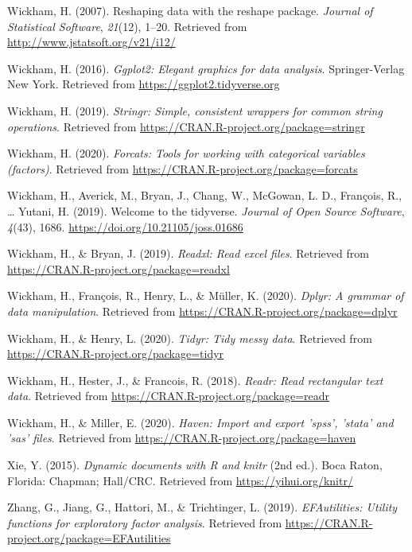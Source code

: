 \documentclass[
  english,
  man]{apa6}
\begin{document}
\leavevmode\hypertarget{ref-R-reshape2}{}%
Wickham, H. (2007). Reshaping data with the reshape package. \emph{Journal of Statistical Software}, \emph{21}(12), 1--20. Retrieved from \url{http://www.jstatsoft.org/v21/i12/}

\leavevmode\hypertarget{ref-R-ggplot2}{}%
Wickham, H. (2016). \emph{Ggplot2: Elegant graphics for data analysis}. Springer-Verlag New York. Retrieved from \url{https://ggplot2.tidyverse.org}

\leavevmode\hypertarget{ref-R-stringr}{}%
Wickham, H. (2019). \emph{Stringr: Simple, consistent wrappers for common string operations}. Retrieved from \url{https://CRAN.R-project.org/package=stringr}

\leavevmode\hypertarget{ref-R-forcats}{}%
Wickham, H. (2020). \emph{Forcats: Tools for working with categorical variables (factors)}. Retrieved from \url{https://CRAN.R-project.org/package=forcats}

\leavevmode\hypertarget{ref-R-tidyverse}{}%
Wickham, H., Averick, M., Bryan, J., Chang, W., McGowan, L. D., François, R., \ldots{} Yutani, H. (2019). Welcome to the tidyverse. \emph{Journal of Open Source Software}, \emph{4}(43), 1686. \url{https://doi.org/10.21105/joss.01686}

\leavevmode\hypertarget{ref-R-readxl}{}%
Wickham, H., \& Bryan, J. (2019). \emph{Readxl: Read excel files}. Retrieved from \url{https://CRAN.R-project.org/package=readxl}

\leavevmode\hypertarget{ref-R-dplyr}{}%
Wickham, H., François, R., Henry, L., \& Müller, K. (2020). \emph{Dplyr: A grammar of data manipulation}. Retrieved from \url{https://CRAN.R-project.org/package=dplyr}

\leavevmode\hypertarget{ref-R-tidyr}{}%
Wickham, H., \& Henry, L. (2020). \emph{Tidyr: Tidy messy data}. Retrieved from \url{https://CRAN.R-project.org/package=tidyr}

\leavevmode\hypertarget{ref-R-readr}{}%
Wickham, H., Hester, J., \& Francois, R. (2018). \emph{Readr: Read rectangular text data}. Retrieved from \url{https://CRAN.R-project.org/package=readr}

\leavevmode\hypertarget{ref-R-haven}{}%
Wickham, H., \& Miller, E. (2020). \emph{Haven: Import and export 'spss', 'stata' and 'sas' files}. Retrieved from \url{https://CRAN.R-project.org/package=haven}

\leavevmode\hypertarget{ref-R-knitr}{}%
Xie, Y. (2015). \emph{Dynamic documents with R and knitr} (2nd ed.). Boca Raton, Florida: Chapman; Hall/CRC. Retrieved from \url{https://yihui.org/knitr/}

\leavevmode\hypertarget{ref-R-EFAutilities}{}%
Zhang, G., Jiang, G., Hattori, M., \& Trichtinger, L. (2019). \emph{EFAutilities: Utility functions for exploratory factor analysis}. Retrieved from \url{https://CRAN.R-project.org/package=EFAutilities}

\endgroup
\end{document}
